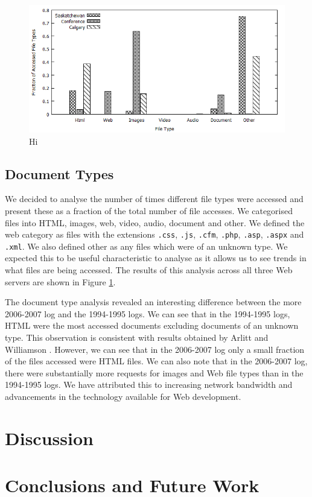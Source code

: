 \documentclass[10pt,conference]{IEEEtran}
\begin{document}
\begin{figure}
    \includegraphics{images/filetype}
    \caption{Hi}\label{fig:file_types}
\end{figure}

\subsection{Document Types}\label{sub:doc_types}
We decided to analyse the number of times different file types were accessed and present these as a fraction of the total number of file accesses. We categorised files into HTML, images, web, video, audio, document and other. We defined the web category as files with the extensions \texttt{.css}, \texttt{.js}, \texttt{.cfm}, \texttt{.php}, \texttt{.asp}, \texttt{.aspx} and \texttt{.xml}. We also defined other as any files which were of an unknown type. We expected this to be useful characteristic to analyse as it allows us to see trends in what files are being accessed. The results of this analysis across all three Web servers are shown in Figure \ref{fig:file_types}.

The document type analysis revealed an interesting difference between the more 2006-2007 log and the 1994-1995 logs. We can see that in the 1994-1995 logs, HTML were the most accessed documents excluding documents of an unknown type. This observation is consistent with results obtained by Arlitt and Williamson \cite{keynote}. However, we can see that in the 2006-2007 log only a small fraction of the files accessed were HTML files. We can also note that in the 2006-2007 log, there were substantially more requests for images and Web file types than in the 1994-1995 logs. We have attributed this to increasing network bandwidth and advancements in the technology available for Web development.

\section{Discussion}\label{discussion}

\section{Conclusions and Future Work}\label{conclusions}



\end{document}

